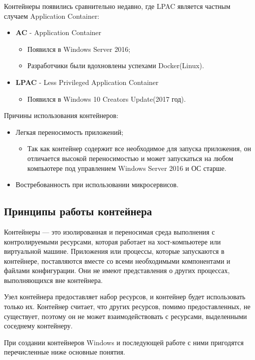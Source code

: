 Контейнеры появились сравнительно недавно, где LPAC является частным случаем Application Container:
\begin{itemize}
\item \textbf{AC} - Application Container
\begin{itemize}
\item Появился в Windows Server 2016;
\item Разработчики были вдохновлены успехами Docker(Linux).
\end{itemize}
\item \textbf{LPAC} - Less Privileged Application Container
\begin{itemize}
\item Появился в Windows 10 Creators Update(2017 год).
\end{itemize}
\end{itemize}

Причины использования контейнеров:
\begin{itemize}
\item Легкая переносимость приложений;
\begin{itemize}
\item Так как контейнер содержит все необходимое для запуска приложения, он отличается высокой переносимостью и может запускаться на любом компьютере под управлением Windows Server 2016 и ОС старше.
\end{itemize}
\item Востребованность при использовании микросервисов.
\end{itemize}



\subsection{Принципы работы контейнера}
Контейнеры — это изолированная и переносимая среда выполнения с контролируемыми ресурсами, которая работает на хост-компьютере или виртуальной машине. Приложения или процессы, которые запускаются в контейнере, поставляются вместе со всеми необходимыми компонентами и файлами конфигурации. Они не имеют представления о других процессах, выполняющихся вне контейнера.

Узел контейнера предоставляет набор ресурсов, и контейнер будет использовать только их. Контейнер считает, что других ресурсов, помимо предоставленных, не существует, поэтому он не может взаимодействовать с ресурсами, выделенными соседнему контейнеру.

При создании контейнеров Windows и последующей работе с ними пригодятся перечисленные ниже основные понятия.

